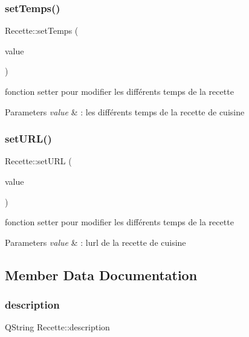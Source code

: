 \subsubsection{\texorpdfstring{set\+Temps()}{setTemps()}}
{\footnotesize\ttfamily Recette\+::set\+Temps (\begin{DoxyParamCaption}\item[{const Q\+String\+List \&}]{value }\end{DoxyParamCaption})}



fonction setter pour modifier les différents temps de la recette 


\begin{DoxyParams}{Parameters}
{\em value} & \+: les différents temps de la recette de cuisine \\
\hline
\end{DoxyParams}
\mbox{\label{classRecette_ac910b38482d259cba788f41669e765b1}} 
\subsubsection{\texorpdfstring{set\+U\+R\+L()}{setURL()}}
{\footnotesize\ttfamily Recette\+::set\+U\+RL (\begin{DoxyParamCaption}\item[{const Q\+String \&}]{value }\end{DoxyParamCaption})}



fonction setter pour modifier les différents temps de la recette 


\begin{DoxyParams}{Parameters}
{\em value} & \+: l\textquotesingle{}url de la recette de cuisine \\
\hline
\end{DoxyParams}


\subsection{Member Data Documentation}
\mbox{\label{classRecette_a140933cc7041efba084ccc66a6dc666a}} 
\subsubsection{\texorpdfstring{description}{description}}
{\footnotesize\ttfamily Q\+String Recette\+::description\hspace{0.3cm}{\ttfamily [private]}}

